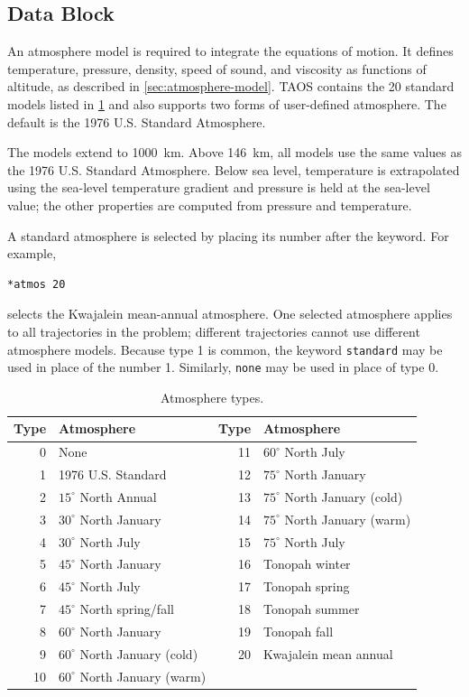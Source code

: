 \subsection{ Data Block}\label{sec:block-atmos}

An atmosphere model is required to integrate the equations of motion. It defines
temperature, pressure, density, speed of sound, and viscosity as functions of altitude,
as described in \cref{sec:atmosphere-model}. TAOS contains the 20 standard
models listed in \cref{tab:atmosphere-types} and also supports two forms of
user-defined atmosphere. The default is the 1976 U.S. Standard Atmosphere.

The models extend to 1000~km. Above 146~km, all models use the same values as the
1976 U.S. Standard Atmosphere. Below sea level, temperature is extrapolated using
the sea-level temperature gradient and pressure is held at the sea-level value; the
other properties are computed from pressure and temperature.

A standard atmosphere is selected by placing its number after the
 keyword. For example,

\begin{lstlisting}[style=taosmanual]
*atmos 20
\end{lstlisting}

selects the Kwajalein mean-annual atmosphere. One selected atmosphere applies to
all trajectories in the problem; different trajectories cannot use different atmosphere
models. Because type 1 is common, the keyword \texttt{standard} may be used in
place of the number 1. Similarly, \texttt{none} may be used in place of type 0.

\begin{table}[htbp]
  \centering
  \caption{Atmosphere types.}
  \label{tab:atmosphere-types}
  \small
  \begin{tabularx}{0.94\linewidth}{@{}rXrX@{}}
    \toprule
    Type & Atmosphere & Type & Atmosphere \\
    \midrule
     0 & None & 11 & $60^\circ$ North July \\
     1 & 1976 U.S. Standard & 12 & $75^\circ$ North January \\
     2 & $15^\circ$ North Annual & 13 & $75^\circ$ North January (cold) \\
     3 & $30^\circ$ North January & 14 & $75^\circ$ North January (warm) \\
     4 & $30^\circ$ North July & 15 & $75^\circ$ North July \\
     5 & $45^\circ$ North January & 16 & Tonopah winter \\
     6 & $45^\circ$ North July & 17 & Tonopah spring \\
     7 & $45^\circ$ North spring/fall & 18 & Tonopah summer \\
     8 & $60^\circ$ North January & 19 & Tonopah fall \\
     9 & $60^\circ$ North January (cold) & 20 & Kwajalein mean annual \\
    10 & $60^\circ$ North January (warm) & & \\
    \bottomrule
  \end{tabularx}
\end{table}

